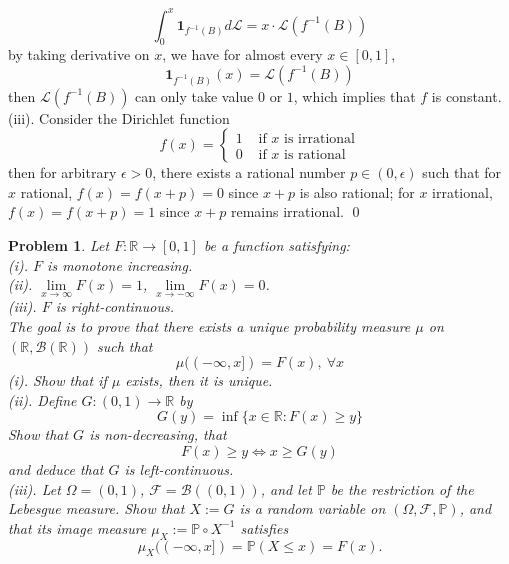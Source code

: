 \documentclass[12pt]{article}
\newtheorem{problem}{Problem}
\begin{document}
$$
    \int_0^x\textbf{1}_{f^{-1}(B)}d\mathcal{L}=x\cdot\mathcal{L}(f^{-1}(B))
$$
by taking derivative on $x$, we have for almost every $x\in[0,1]$, 
$$
    \textbf{1}_{f^{-1}(B)}(x)=\mathcal{L}(f^{-1}(B))
$$
then $\mathcal{L}(f^{-1}(B))$ can only take value $0$ or $1$, which implies that $f$ is constant. 
\\
\indent (iii). Consider the Dirichlet function 
$$
    f(x)=\begin{cases}
  1& \text{ if } x \text{ is irrational} \\
  0& \text{ if } x \text{ is rational}
\end{cases}
$$
then for arbitrary $\epsilon>0$, there exists a rational number $p\in (0,\epsilon)$ such that for $x$ rational, $f(x)=f(x+p)=0$ since $x+p$ is also rational; for $x$ irrational, $f(x)=f(x+p)=1$ since $x+p$ remains irrational. \qed
\\
\begin{problem}
    Let $F:\mathbb{R}\to[0,1]$ be a function satisfying:\\
    \indent (i). $F$ is monotone increasing. \\
    \indent (ii). $\lim\limits_{x\to\infty} F(x)=1$, $\lim\limits_{x\to-\infty}F(x)=0$. \\
    \indent (iii). $F$ is right-continuous. \\
    The goal is to prove that there exists a unique probability measure $\mu$ on $(\mathbb{R}, \mathcal{B}(\mathbb{R}))$ such that 
    $$
        \mu((-\infty, x])=F(x), \ \forall x
    $$
    \indent (i). Show that if $\mu$ exists, then it is unique. \\
    \indent (ii). Define $G: (0,1)\to\mathbb{R}$ by
    $$
        G(y)=\inf\{x\in\mathbb{R}: F(x)\geq y\}
    $$
    Show that $G$ is non-decreasing, that 
    $$
        F(x)\geq y \iff x\geq G(y)
    $$
    and deduce that $G$ is left-continuous. \\
    \indent (iii). Let $\Omega=(0,1)$, $\mathcal{F}=\mathcal{B}((0,1))$, and let $\mathbb{P}$ be the restriction of the Lebesgue measure. Show that $X:= G$ is a random variable on $(\Omega, \mathcal{F}, \mathbb{P})$, and that its image measure $\mu_{X}:= \mathbb{P}\circ X^{-1}$ satisfies
    $$
        \mu_X((-\infty,x])=\mathbb{P}(X\leq x)=F(x).
    $$
\end{problem}
\end{document}
